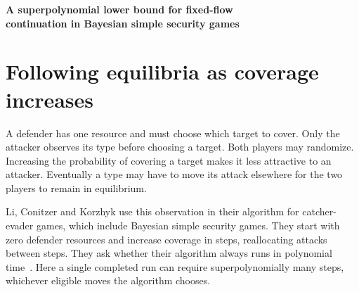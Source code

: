 \documentclass[11pt,letterpaper]{article}
\theoremstyle{definition}
\begin{document}
\begin{center}
  {\LARGE\bfseries A superpolynomial lower bound for fixed-flow\\[.10em]
    continuation in Bayesian simple security games\par}
\end{center}

\begin{abstract}
One way to find an equilibrium in a security game is to start with no defender
coverage and increase it while the attacker keeps playing a best response.
How often must the attack distribution change along the way? We construct
one-resource games in which every such continuation that holds attack flow
fixed during each budget increase needs \(L^{\Omega(\log L)}\) segments,
where \(L\) is the binary input length. Distinct shortest paths in a parametric
graph prescribe which target each type attacks on successive budget intervals.
Every equilibrium obeys the prescription, even as total attack probability
stays equal across targets. On the same games an assignment and a linear
program compute an equilibrium at the final budget in polynomial time.
\end{abstract}

\section{Following equilibria as coverage increases}

A defender has one resource and must choose which target to cover. Only
the attacker observes its type before choosing a target. Both players may
randomize. Increasing the probability of covering a target makes it less
attractive to an attacker. Eventually a type may have to move its attack
elsewhere for the two players to remain in equilibrium.

Li, Conitzer and Korzhyk use this observation in their algorithm for
catcher-evader games, which include Bayesian simple security games. They
start with zero defender resources and increase coverage in steps, reallocating
attacks between steps. They ask whether their algorithm always runs in
polynomial time~\cite[\S\S3.1, 6.2 and 7]{LCK}. Here a single completed run
can require superpolynomially many steps, whichever eligible moves the
algorithm chooses.
\end{document}
